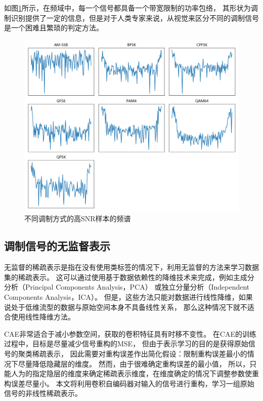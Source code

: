 如图\ref{sec:fig_3_3}所示，在频域中，每一个信号都具备一个带宽限制的功率包络，
其形状为调制识别提供了一定的信息，但是对于人类专家来说，从视觉来区分不同的调制信号是一个困难且繁琐的判定方法。\par
\begin{figure}[!h]
	\centering
	\includegraphics[scale=0.45]{figures/chapter_3/fig_3_3}
	
	\caption{不同调制方式的高SNR样本的频谱}\label{sec:fig_3_3}
\end{figure}

\subsection{调制信号的无监督表示}

无监督的稀疏表示是指在没有使用类标签的情况下，利用无监督的方法来学习数据集的稀疏表示。
这可以通过使用基于数据依赖性的降维技术来完成，例如主成分分析（Principal Components Analysis，PCA）
或独立分量分析（Independent Components Analysis，ICA）。
但是，这些方法只能对数据进行线性降维，如果说处于低维流型的数据与原始空间本身不具备线性关系，
那么这种情况下就不适合使用线性降维方法。\par

CAE非常适合于减小参数空间，获取的卷积特征具有时移不变性。
在CAE的训练过程中，目标是尽量减少信号重构的MSE，
但由于表示学习的目的是获得原始信号的聚类稀疏表示，
因此需要对重构误差作出简化假设：限制重构误差最小的情况下尽量降低隐藏层的维度。
然而，由于很难确定重构误差的最小值，
所以，只能人为的指定隐层的维度来确定稀疏表示维度，在维度确定的情况下调整参数使重构误差尽量小。
本文将利用卷积自编码器对输入的信号进行重构，学习一组原始信号的非线性稀疏表示。\par

